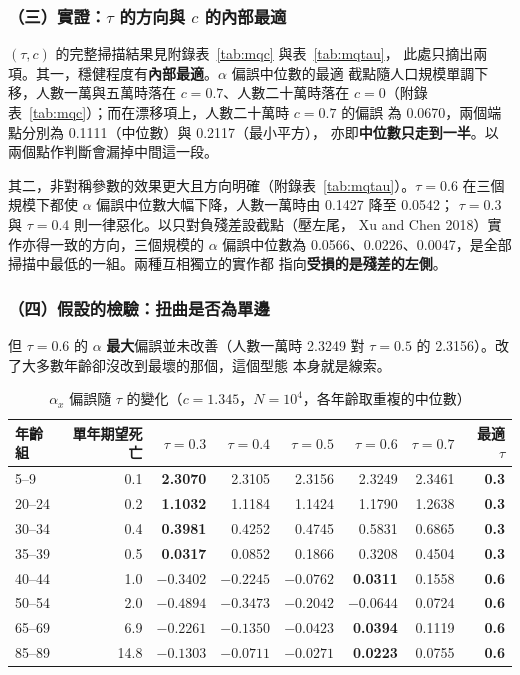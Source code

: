 \documentclass[UTF8, fontset=macnew, a4paper, 12pt]{ctexart}
\begin{document}
\subsubsection{（三）實證：$\tau$ 的方向與 $c$ 的內部最適}



$(\tau,c)$ 的完整掃描結果見附錄表~\ref{tab:mqc} 與表~\ref{tab:mqtau}，
此處只摘出兩項。其一，穩健程度有\textbf{內部最適}。$\alpha$ 偏誤中位數的最適
截點隨人口規模單調下移，人數一萬與五萬時落在 $c=0.7$、人數二十萬時落在
$c=0$（附錄表~\ref{tab:mqc}）；而在漂移項上，人數二十萬時 $c=0.7$ 的偏誤
為 0.0670，兩個端點分別為 0.1111（中位數）與 0.2117（最小平方），
亦即\textbf{中位數只走到一半}。以兩個點作判斷會漏掉中間這一段。

其二，非對稱參數的效果更大且方向明確（附錄表~\ref{tab:mqtau}）。$\tau=0.6$ 在三個規模下都使
$\alpha$ 偏誤中位數大幅下降，人數一萬時由 0.1427 降至 0.0542；
$\tau=0.3$ 與 $\tau=0.4$ 則一律惡化。以只對負殘差設截點（壓左尾，
Xu and Chen 2018）實作亦得一致的方向，三個規模的 $\alpha$ 偏誤中位數為
0.0566、0.0226、0.0047，是全部掃描中最低的一組。兩種互相獨立的實作都
指向\textbf{受損的是殘差的左側}。

\subsubsection{（四）假設的檢驗：扭曲是否為單邊}

但 $\tau=0.6$ 的 $\alpha$ \textbf{最大}偏誤並未改善（人數一萬時 2.3249
對 $\tau=0.5$ 的 2.3156）。改了大多數年齡卻沒改到最壞的那個，這個型態
本身就是線索。


\begin{table}[H]
\centering
\caption{$\alpha_x$ 偏誤隨 $\tau$ 的變化（$c=1.345$，$N=10^4$，各年齡取重複的中位數）}
\small
\begin{tabular}{lrrrrrrr}
\toprule
年齡組 & 單年期望死亡 & $\tau=0.3$ & $\tau=0.4$ & $\tau=0.5$ & $\tau=0.6$ & $\tau=0.7$ & 最適 $\tau$\\
\midrule
5--9   & \phantom{00}0.1 & \textbf{2.3070} & 2.3105 & 2.3156 & 2.3249 & 2.3461 & \textbf{0.3}\\
20--24 & \phantom{00}0.2 & \textbf{1.1032} & 1.1184 & 1.1424 & 1.1790 & 1.2638 & \textbf{0.3}\\
30--34 & \phantom{00}0.4 & \textbf{0.3981} & 0.4252 & 0.4745 & 0.5831 & 0.6865 & \textbf{0.3}\\
35--39 & \phantom{00}0.5 & \textbf{0.0317} & 0.0852 & 0.1866 & 0.3208 & 0.4504 & \textbf{0.3}\\
\midrule
40--44 & \phantom{00}1.0 & $-0.3402$ & $-0.2245$ & $-0.0762$ & \textbf{0.0311} & 0.1558 & \textbf{0.6}\\
50--54 & \phantom{00}2.0 & $-0.4894$ & $-0.3473$ & $-0.2042$ & \textbf{$-0.0644$} & 0.0724 & \textbf{0.6}\\
65--69 & \phantom{00}6.9 & $-0.2261$ & $-0.1350$ & $-0.0423$ & \textbf{0.0394} & 0.1119 & \textbf{0.6}\\
85--89 & \phantom{0}14.8 & $-0.1303$ & $-0.0711$ & $-0.0271$ & \textbf{0.0223} & 0.0755 & \textbf{0.6}\\
\bottomrule
\end{tabular}
\label{tab:mqage}
\end{table}
\end{document}
